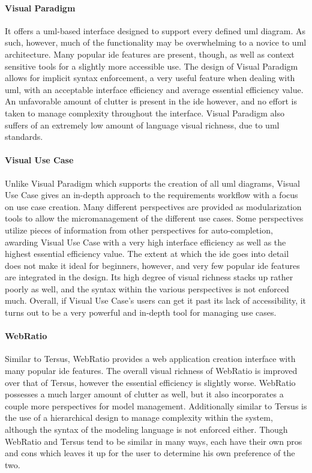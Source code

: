 \paragraph{Visual Paradigm} It offers a \ac{uml}-based interface designed
to support every defined \ac{uml} diagram. As such, however, much of the
functionality may be overwhelming to a novice to \ac{uml} architecture.
Many popular \ac{ide} features are present, though, as well as context
sensitive tools for a slightly more accessible use. The design of Visual
Paradigm allows for implicit syntax enforcement, a very useful feature when
dealing with \ac{uml}, with an acceptable interface efficiency and average
essential efficiency value. An unfavorable amount of clutter is present in
the \ac{ide} however, and no effort is taken to manage complexity
throughout the interface. Visual Paradigm also suffers of an extremely low
amount of language visual richness, due to \ac{uml} standards.

\paragraph{Visual Use Case} Unlike Visual Paradigm which supports the
creation of all \ac{uml} diagrams, Visual Use Case gives an in-depth
approach to the requirements workflow with a focus on use case creation.
Many different perspectives are provided as modularization tools to allow
the micromanagement of the different use cases. Some perspectives utilize
pieces of information from other perspectives for auto-completion, awarding
Visual Use Case with a very high interface efficiency as well as the
highest essential efficiency value. The extent at which the \ac{ide} goes
into detail does not make it ideal for beginners, however, and very few
popular \ac{ide} features are integrated in the design. Its high degree of
visual richness stacks up rather poorly as well, and the syntax within the
various perspectives is not enforced much. Overall, if Visual Use Case's
users can get it past its lack of accessibility, it turns out to be a very
powerful and in-depth tool for managing use cases.

\paragraph{WebRatio} Similar to Tersus, WebRatio provides a web application
creation interface with many popular \ac{ide} features. The overall visual
richness of WebRatio is improved over that of Tersus, however the essential
efficiency is slightly worse. WebRatio possesses a much larger amount of
clutter as well, but it also incorporates a couple more perspectives for
model management. Additionally similar to Tersus is the use of a
hierarchical design to manage complexity within the system, although the
syntax of the modeling language is not enforced either. Though WebRatio and
Tersus tend to be similar in many ways, each have their own pros and cons
which leaves it up for the user to determine his own preference of the two.

